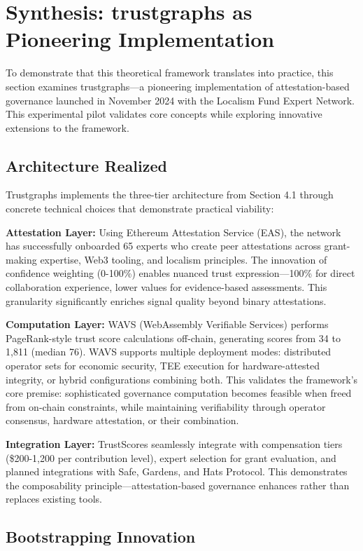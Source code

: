 \section{Synthesis: trustgraphs as Pioneering Implementation}

To demonstrate that this theoretical framework translates into practice, this section examines trustgraphs—a pioneering implementation of attestation-based governance launched in November 2024 with the Localism Fund Expert Network. This experimental pilot validates core concepts while exploring innovative extensions to the framework.

\subsection{Architecture Realized}

Trustgraphs implements the three-tier architecture from Section 4.1 through concrete technical choices that demonstrate practical viability:

\textbf{Attestation Layer:} Using Ethereum Attestation Service (EAS), the network has successfully onboarded 65 experts who create peer attestations across grant-making expertise, Web3 tooling, and localism principles. The innovation of confidence weighting (0-100\%) enables nuanced trust expression—100\% for direct collaboration experience, lower values for evidence-based assessments. This granularity significantly enriches signal quality beyond binary attestations.

\textbf{Computation Layer:} WAVS (WebAssembly Verifiable Services) performs PageRank-style trust score calculations off-chain, generating scores from 34 to 1,811 (median 76). WAVS supports multiple deployment modes: distributed operator sets for economic security, TEE execution for hardware-attested integrity, or hybrid configurations combining both. This validates the framework's core premise: sophisticated governance computation becomes feasible when freed from on-chain constraints, while maintaining verifiability through operator consensus, hardware attestation, or their combination.

\textbf{Integration Layer:} TrustScores seamlessly integrate with compensation tiers (\$200-1,200 per contribution level), expert selection for grant evaluation, and planned integrations with Safe, Gardens, and Hats Protocol. This demonstrates the composability principle—attestation-based governance enhances rather than replaces existing tools.

\subsection{Bootstrapping Innovation}

